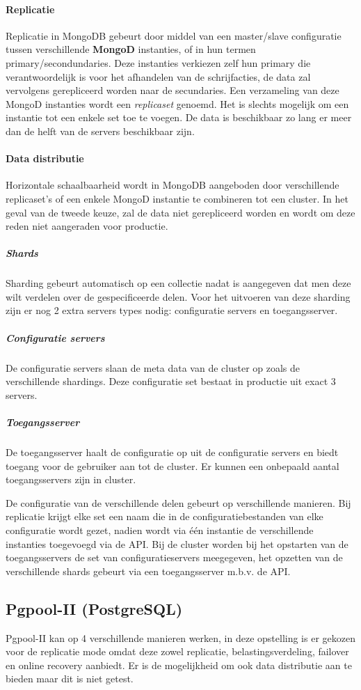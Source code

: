 \paragraph{Replicatie\cite{mongodb-replicaset}} Replicatie in MongoDB gebeurt door middel van een master/slave configuratie tussen verschillende \textbf{MongoD} instanties, of in hun termen primary/secondundaries. Deze instanties verkiezen zelf hun primary die verantwoordelijk is voor het afhandelen van de schrijfacties, de data zal vervolgens gerepliceerd worden naar de secundaries. Een verzameling van deze MongoD instanties wordt een \textit{replicaset} genoemd. Het is slechts mogelijk om een instantie tot een enkele set toe te voegen. De data is beschikbaar zo lang er meer dan de helft van de servers beschikbaar zijn. 

\paragraph{Data distributie\cite{mongodb-shard}} Horizontale schaalbaarheid wordt in MongoDB aangeboden door verschillende replicaset's of een enkele MongoD instantie te combineren tot een cluster. In het geval van de tweede keuze, zal de data niet gerepliceerd worden en wordt om deze reden niet aangeraden voor productie. 
\subparagraph{Shards} Sharding gebeurt automatisch op een collectie nadat is aangegeven dat men deze wilt verdelen over de gespecificeerde delen. Voor het uitvoeren van deze sharding zijn er nog 2 extra servers types nodig: configuratie servers en toegangsserver. 
\subparagraph{Configuratie servers} De configuratie servers slaan de meta data van de cluster op zoals de verschillende shardings. Deze configuratie set bestaat in productie uit exact 3 servers.
\subparagraph{Toegangsserver} De toegangsserver haalt de configuratie op uit de configuratie servers en biedt toegang voor de gebruiker aan tot de cluster. Er kunnen een onbepaald aantal toegangsservers zijn in cluster. 

De configuratie van de verschillende delen gebeurt op verschillende manieren. Bij replicatie krijgt elke set een naam die in de configuratiebestanden van elke configuratie wordt gezet, nadien wordt via één instantie de verschillende instanties toegevoegd via de API. Bij de cluster worden bij het opstarten van de toegangsservers de set van configuratieservers meegegeven, het opzetten van de verschillende shards gebeurt via een toegangsserver m.b.v. de API. 

\subsection{Pgpool-II (PostgreSQL)\cite{pgpool-doc}}
Pgpool-II kan op 4 verschillende manieren werken, in deze opstelling is er gekozen voor de replicatie mode omdat deze zowel replicatie, belastingsverdeling, failover en online recovery aanbiedt. Er is de mogelijkheid om ook data distributie aan te bieden maar dit is niet getest. 

